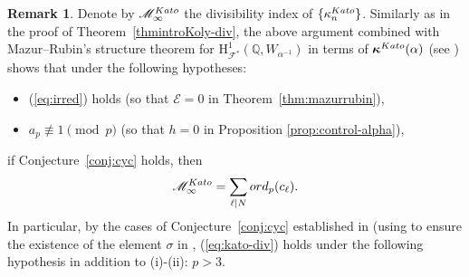 \documentclass[10pt,reqno]{amsart}
\numberwithin{equation}{section}
\theoremstyle{plain}
\theoremstyle{definition}
\newtheorem{rem}[thm]{Remark}
\theoremstyle{definition}
\theoremstyle{plain}
\theoremstyle{plain}
\theoremstyle{plain}
\theoremstyle{plain}
\theoremstyle{plain}
\theoremstyle{plain}
\newcommand{\Q}{\mathbb{Q}}
\newcommand{\bkappa}{\boldsymbol{\kappa}}
\newcommand{\Fcal}{\mathcal{F}}
\newcommand{\rH}{\mathrm{H}}
\begin{document}
\begin{rem}\label{rem:refined-kato}
Denote by $\mathscr{M}_\infty^{\rm Kato}$ the divisibility index of $\{\kappa_n^{\rm Kato}\}$. 
Similarly as in the proof of Theorem~\ref{thmintroKoly-div}, the above argument combined with Mazur--Rubin's structure theorem for $\rH^1_{\Fcal^*}(\Q,W_{\alpha^{-1}})$ in terms of $\bkappa^{\rm Kato}(\alpha)$ (see \cite[Thm.~5.2.12]{mazrub}) shows that under the following hypotheses: 
\begin{itemize}
\item[(i)] (\ref{eq:irred}) holds (so that $\mathcal{E}=0$ in Theorem~\ref{thm:mazurrubin}), 
\item[(ii)] $a_p\not\equiv 1\pmod{p}$ (so that %
$h=0$ in Proposition \ref{prop:control-alpha}),
\end{itemize}
if Conjecture~\ref{conj:cyc} holds, then
\begin{equation}\label{eq:kato-div}
\mathscr{M}_\infty^{\rm Kato}=\sum_{\ell\mid N}{\rm ord}_p(c_\ell).
\end{equation}
In particular, by the cases of Conjecture~\ref{conj:cyc} established in \cite{bcs} (using \cite[IV-23, Lem.~3]{serre-ladic} to ensure the existence of the element $\sigma$ in \cite[Thm.~1.1.2]{bcs}, (\ref{eq:kato-div}) holds under the following hypothesis in addition to (i)-(ii): $p>3$.
\end{rem}
\end{document}
